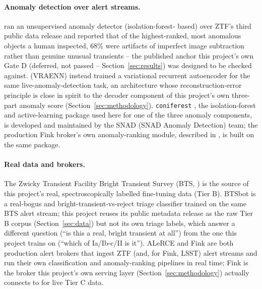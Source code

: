 \paragraph{Anomaly detection over alert streams.}
\citet{malanchev2021} ran an unsupervised anomaly detector (isolation-forest-
based) over ZTF's third public data release and reported that of the
highest-ranked, most anomalous objects a human inspected, 68\% were
artifacts of imperfect image subtraction rather than genuine unusual
transients -- the published anchor this project's own Gate D (deferred, not
passed -- Section~\ref{sec:results}) was designed to be checked against.
\citet{villar2021vraenn} (VRAENN) instead trained a variational recurrent
autoencoder for the same live-anomaly-detection task, an architecture whose
reconstruction-error principle is close in spirit to the decoder component
of this project's own three-part anomaly score
(Section~\ref{sec:methodology}). \texttt{coniferest} \citep{coniferest}, the
isolation-forest and active-learning package used here for one of the three
anomaly components, is developed and maintained by the SNAD (SNAD Anomaly
Detection) team; the production Fink broker's own anomaly-ranking module,
described in \citet{moller2021fink}, is built on the same package.

\paragraph{Real data and brokers.}
The Zwicky Transient Facility Bright Transient Survey (BTS,
\citealp{fremling2020bts,perley2020bts}) is the source of this project's
real, spectroscopically labelled fine-tuning data (Tier B). BTSbot
\citep{rehemtulla2024btsbot} is a real-bogus and bright-transient-vs-reject
triage classifier trained on the same BTS alert stream; this project reuses
its public metadata release as the raw Tier B corpus (Section~\ref{sec:data})
but not its own triage labels, which answer a different question (``is this
a real, bright transient at all'') from the one this project trains on
(``which of Ia/Ib-c/II is it''). ALeRCE \citep{forster2021alerce} and Fink
\citep{moller2021fink} are both production alert brokers that ingest ZTF
(and, for Fink, LSST) alert streams and run their own classification and
anomaly-ranking pipelines in real time; Fink is the broker this project's
own serving layer (Section~\ref{sec:methodology}) actually connects to for
live Tier C data.

